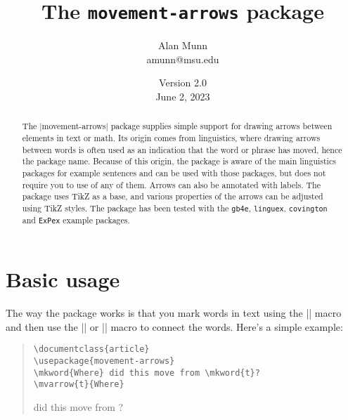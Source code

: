 \documentclass[11pt]{article}
\title{The \texttt{movement-arrows} package}
\author{Alan Munn\\amunn@msu.edu}
\date{Version 2.0\\June 2, 2023}
\newcommand*{\pkg}[1]{\texttt{#1}}
\begin{document}
\maketitle
\thispagestyle{empty}
\begin{abstract}{\noindent
The |movement-arrows| package supplies simple support for drawing  arrows between elements in text or math. Its origin comes from linguistics, where drawing arrows between words is often used as an indication that the word or phrase has moved, hence the package name.  Because of this origin, the package is aware of the main linguistics packages for example sentences and can be used with those packages, but does not require you to use of any of them.  Arrows can also be annotated with labels.  The package uses TikZ as a base, and various properties of the arrows can be adjusted using TikZ styles. The package has been tested with the \pkg{gb4e}, \pkg{linguex}, \pkg{covington} and \pkg{ExPex} example packages.
}
\end{abstract}

\section{Basic usage}
The way the package works is that you mark words in text using the |\mkword| macro and then use the |\mvarrow| or |\mvlink| macro to connect the words.  Here's a simple example:

\begin{quote}
\begin{lstlisting}
\documentclass{article}
\usepackage{movement-arrows}
\mkword{Where} did this move from \mkword{t}?
\mvarrow{t}{Where}
\end{lstlisting}
 did this move from ?
\end{quote}
\end{document}
